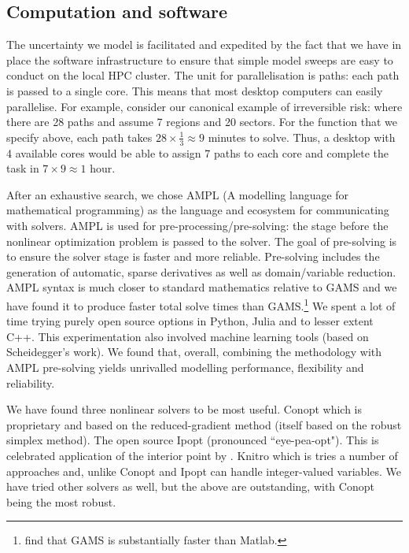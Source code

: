 \documentclass[12pt,a4paper,twoside, draft]{article}
\begin{document}
\subsection{Computation and software}

The uncertainty we model is facilitated and expedited by the fact that we have
in place the software infrastructure to ensure that simple model sweeps are
easy to conduct on the local HPC cluster.
The unit for parallelisation is paths: each path is passed to a single core.
This means that most desktop computers can easily parallelise.
For example, consider our canonical example of irreversible risk:
where there are 28 paths and 
assume 7 regions and 20 sectors.
For the function that we specify above, each path takes
$28\times \frac{1}{3} \approx 9$ minutes to solve.
Thus, a desktop with 4 available cores would be able to assign 7 paths to
each core and complete the task in $7\times 9 \approx 1$ hour.

After an exhaustive search, we chose AMPL (A modelling language for
mathematical programming) \citet{Fourer_Gay_Kernighan-AMPL} as the language and 
ecosystem for communicating with solvers.
AMPL is used for pre-processing/pre-solving: the stage before the nonlinear
optimization problem is passed to the solver.
The goal of pre-solving is to ensure the solver stage is faster and more
reliable.
Pre-solving includes the generation of automatic, sparse derivatives as well as
domain/variable reduction.
AMPL syntax is much closer to standard mathematics relative to GAMS and we have
found it to produce faster total solve times than GAMS.\footnote{
\citet{CJ} find that GAMS is substantially faster than Matlab.
}
We spent a lot of time trying purely open source options in Python, Julia and
to lesser extent C++.
This experimentation also involved machine learning tools (based on
Scheidegger's work).
We found that, overall, combining the \citet{CJ} methodology with AMPL
pre-solving yields unrivalled modelling performance, flexibility and
reliability.


We have found three nonlinear solvers to be most useful.
Conopt which is proprietary and based on the reduced-gradient method (itself
based on the robust simplex method).
The open source Ipopt (pronounced ``eye-pea-opt"). This is celebrated
application of the interior point by \citet{Wachter_Biegler-Ipopt}.
Knitro which is tries a number of approaches and, unlike Conopt and Ipopt can
handle integer-valued variables. 
We have tried other solvers as well, but the above are outstanding, with Conopt
being the most robust.
\end{document}
